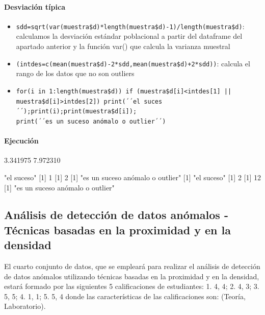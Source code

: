 \documentclass[a4paper, 12pt]{article}
\begin{document}
	\paragraph{Desviación típica}
	\begin{itemize}
		\item \texttt{sdd=sqrt(var(muestra\$d)*length(muestra\$d)-1)/length(muestra\$d)}: calculamos la desviación estándar poblacional a partir del dataframe del apartado anterior y la función var() que calcula la varianza muestral
		\item \texttt{(intdes=c(mean(muestra\$d)-2*sdd,mean(muestra\$d)+2*sdd))}: calcula el rango de los datos que no son outliers
		\item \texttt{for(i in 1:length(muestra\$d)) {if (muestra\$d[i]<intdes[1] || \\ muestra\$d[i]>intdes[2]) {print(´´el suces´´);print(i);print(muestra\$d[i]);\\print(´´es un suceso anómalo o outlier´´)}}}
	\end{itemize}
	\paragraph{Ejecución}
\begin{Schunk}
\begin{Soutput}
[1] 3.341975 7.972310
\end{Soutput}
\begin{Soutput}
[1] "el suceso"
[1] 1
[1] 2
[1] "es un suceso anómalo o outlier"
[1] "el suceso"
[1] 2
[1] 12
[1] "es un suceso anómalo o outlier"
\end{Soutput}
\end{Schunk}
	\subsection{Análisis de detección de datos anómalos - Técnicas basadas en la proximidad y en la densidad}
	El cuarto conjunto de datos, que se empleará para realizar el análisis de detección de datos anómalos utilizando técnicas basadas en la proximidad y en la densidad, estará formado por las siguientes 5 calificaciones de estudiantes: 1. {4, 4}; 2. {4, 3}; 3. {5, 5}; 4. {1, 1}; 5. {5, 4} donde las características de las calificaciones son: (Teoría, Laboratorio).
	
\end{document}
